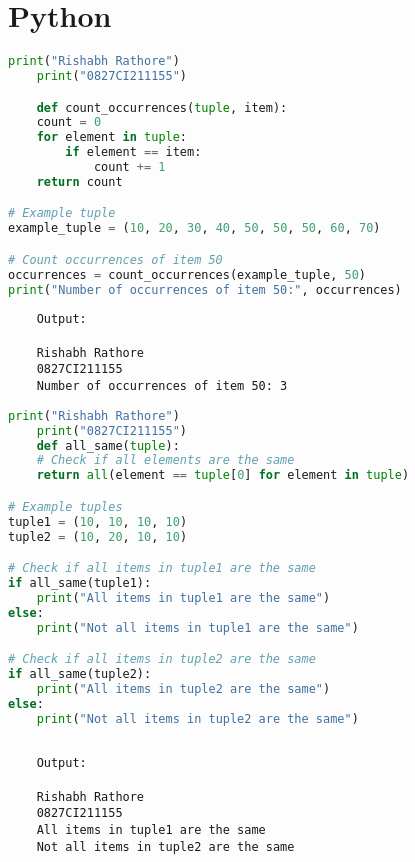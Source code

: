 \documentclass{report}
\begin{document}
\pagebreak

\setcounter{chapter}{1}
\setcounter{section}{0}
\section{Python}
\sol 
\begin{lstlisting}[language=Python]
	print("Rishabh Rathore")
	print("0827CI211155")

	def count_occurrences(tuple, item):
    count = 0
    for element in tuple:
        if element == item:
            count += 1
    return count

# Example tuple
example_tuple = (10, 20, 30, 40, 50, 50, 50, 60, 70)

# Count occurrences of item 50
occurrences = count_occurrences(example_tuple, 50)
print("Number of occurrences of item 50:", occurrences)


\end{lstlisting}

\begin{verbatim}
	Output:

	Rishabh Rathore
	0827CI211155
	Number of occurrences of item 50: 3
\end{verbatim}


\newpage


\sol 
\begin{lstlisting}[language=Python]
	print("Rishabh Rathore")
	print("0827CI211155")
	def all_same(tuple):
    # Check if all elements are the same
    return all(element == tuple[0] for element in tuple)

# Example tuples
tuple1 = (10, 10, 10, 10)
tuple2 = (10, 20, 10, 10)

# Check if all items in tuple1 are the same
if all_same(tuple1):
    print("All items in tuple1 are the same")
else:
    print("Not all items in tuple1 are the same")

# Check if all items in tuple2 are the same
if all_same(tuple2):
    print("All items in tuple2 are the same")
else:
    print("Not all items in tuple2 are the same")
  

\end{lstlisting}

\begin{verbatim}
	Output:

	Rishabh Rathore
	0827CI211155
	All items in tuple1 are the same
	Not all items in tuple2 are the same

\end{verbatim}
\end{document}
